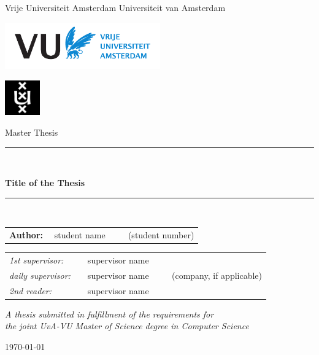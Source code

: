 \documentclass[twoside,11pt]{Latex/Classes/PhDthesisPSnPDF}
\begin{document}
\thispagestyle{empty}

\begin{center}

Vrije Universiteit Amsterdam \hspace*{2cm} Universiteit van Amsterdam

\vspace{1mm}

\hspace*{-6.5cm}\includegraphics[height=20mm]{0_frontmatter/figures/vu-griffioen.pdf}

\vspace*{-2cm}\hspace*{7.5cm}\includegraphics[height=15mm]{0_frontmatter/figures/uva_logo.jpg}

\vspace{2cm}

{\Large Master Thesis}

\vspace*{1.5cm}

\rule{.9\linewidth}{.6pt}\\[0.4cm]
{\huge \bfseries Title of the Thesis\par}\vspace{0.4cm}
\rule{.9\linewidth}{.6pt}\\[1.5cm]

\vspace*{2mm}

{\Large
\begin{tabular}{l}
{\bf Author:} ~~student name ~~~~ (student number)
\end{tabular}
}

\vspace*{2cm}

\begin{tabular}{ll}
{\it 1st supervisor:}   & ~~supervisor name \\
{\it daily supervisor:} & ~~supervisor name ~~~~ (company, if applicable) \\
{\it 2nd reader:}       & ~~supervisor name
\end{tabular}

\vspace*{2.5cm}

\textit{A thesis submitted in fulfillment of the requirements for\\ the joint UvA-VU Master of Science degree in Computer Science}

\vspace*{1.8cm}

\today\\[4cm] %

\end{center}
\end{document}
